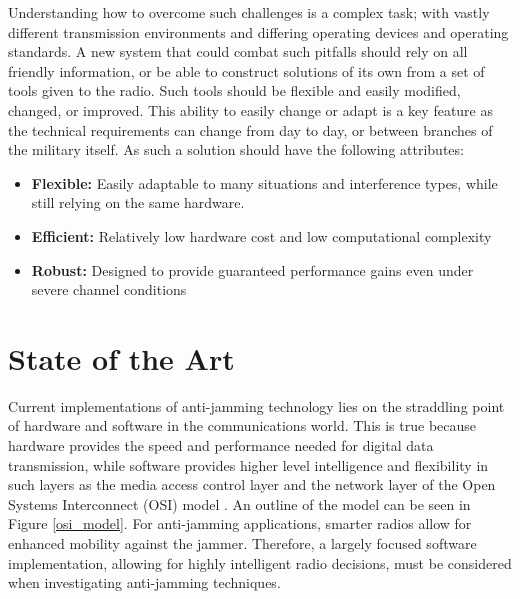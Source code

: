 Understanding how to overcome such challenges is a complex task; with vastly different transmission environments and differing operating devices and operating standards.  A new system that could combat such pitfalls should rely on all friendly information, or be able to construct solutions of its own from a set of tools given to the radio.  Such tools should be flexible and easily modified, changed, or improved.  This ability to easily change or adapt is a key feature as the technical requirements can change from day to day, or between branches of the military itself. As such a solution should have the following attributes:

\begin{itemize}
\item \textbf{Flexible:} Easily adaptable to many situations and interference types, while still relying on the same hardware.

\item \textbf{Efficient:} Relatively low hardware cost and low computational complexity

\item \textbf{Robust:} Designed to provide guaranteed performance gains even under severe channel conditions

\end{itemize}


\section{State of the Art}

Current implementations of anti-jamming technology lies on the straddling point of hardware and software in the communications world.  This is true because hardware provides the speed and performance needed for digital data transmission, while software provides higher level intelligence and flexibility in such layers as the media access control layer and the network layer of the Open Systems Interconnect (OSI) model \cite{Zimmermann}.  An outline of the model can be seen in Figure \ref{osi_model}. For anti-jamming applications, smarter radios allow for enhanced mobility against the jammer.  Therefore, a largely focused software implementation, allowing for highly intelligent radio decisions, must be considered when investigating anti-jamming techniques.\\

